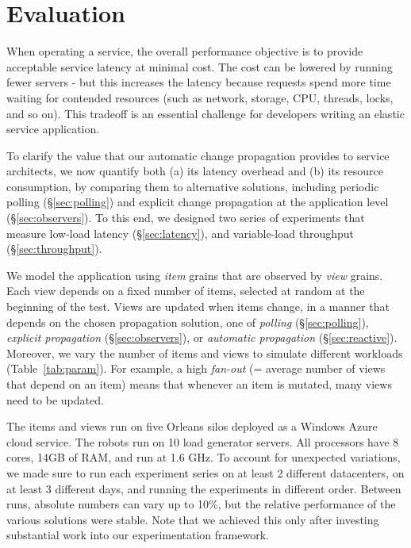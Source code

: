 \section{Evaluation}\label{sec:evaluation}

When operating a service, the overall performance objective is to provide acceptable service latency at minimal cost. The cost can be lowered by running fewer servers - but this increases the latency because requests spend more time waiting for contended resources (such as network, storage, CPU, threads, locks, and so on). This tradeoff is an essential challenge for developers writing an elastic service application. 

To clarify the value that our automatic change propagation provides to service architects, we now quantify both (a) its latency overhead and (b) its resource consumption, by comparing them to alternative solutions, including periodic polling (\S\ref{sec:polling}) and explicit change propagation at the application level (\S\ref{sec:observers}). To this end, we designed two series of experiments that measure low-load latency (\S\ref{sec:latency}), and variable-load throughput (\S\ref{sec:throughput}).

We model the application using  \emph{item} grains that are observed by \emph{view} grains. Each view depends on a fixed number of items, selected at random at the beginning of the test. Views are updated when items change, in a manner that depends on the chosen propagation solution, one of \emph{polling} (\S\ref{sec:polling}), \emph{explicit propagation} (\S\ref{sec:observers}), or \emph{automatic propagation} (\S\ref{sec:reactive}). Moreover, we vary the number of items and views to simulate different workloads (Table~\ref{tab:param}).  For example, a high \emph{fan-out} (= average number of views that depend on an item) means that whenever an item is mutated, many views need to be updated.  

 
The items and views run on five Orleans silos deployed as a Windows Azure cloud service. The robots run on 10 load generator servers. All processors have 8 cores, 14GB of RAM, and run at 1.6 GHz. To account for unexpected variations, we made sure to run each experiment series on at least 2 different datacenters, on at least 3 different days, and running the experiments in different order. Between runs, absolute numbers can vary up to 10\%, but the relative performance of the various solutions were stable. Note that we achieved this only after investing substantial work into our experimentation framework. 


